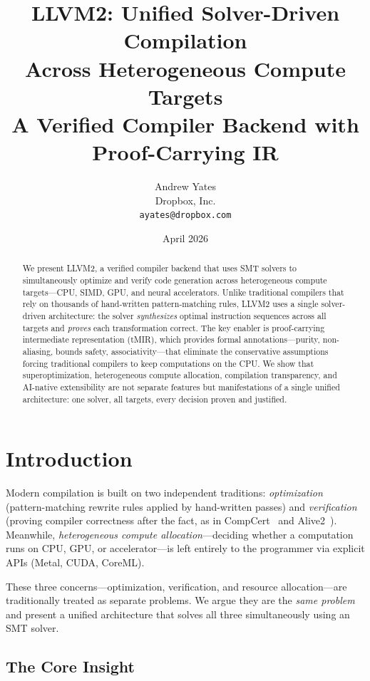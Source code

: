 \documentclass[11pt,twocolumn]{article}
\title{\textbf{LLVM2: Unified Solver-Driven Compilation\\Across Heterogeneous Compute Targets}\\[0.5em]
\large A Verified Compiler Backend with Proof-Carrying IR}
\author{Andrew Yates\\Dropbox, Inc.\\{\small\texttt{ayates@dropbox.com}}}
\date{April 2026}
\begin{document}
\maketitle

\begin{abstract}
We present LLVM2, a verified compiler backend that uses SMT solvers to simultaneously optimize and verify code generation across heterogeneous compute targets---CPU, SIMD, GPU, and neural accelerators. Unlike traditional compilers that rely on thousands of hand-written pattern-matching rules, LLVM2 uses a single solver-driven architecture: the solver \emph{synthesizes} optimal instruction sequences across all targets and \emph{proves} each transformation correct. The key enabler is proof-carrying intermediate representation (tMIR), which provides formal annotations---purity, non-aliasing, bounds safety, associativity---that eliminate the conservative assumptions forcing traditional compilers to keep computations on the CPU. We show that superoptimization, heterogeneous compute allocation, compilation transparency, and AI-native extensibility are not separate features but manifestations of a single unified architecture: one solver, all targets, every decision proven and justified.
\end{abstract}

\section{Introduction}

Modern compilation is built on two independent traditions: \emph{optimization} (pattern-matching rewrite rules applied by hand-written passes) and \emph{verification} (proving compiler correctness after the fact, as in CompCert~\cite{compcert} and Alive2~\cite{alive2}). Meanwhile, \emph{heterogeneous compute allocation}---deciding whether a computation runs on CPU, GPU, or accelerator---is left entirely to the programmer via explicit APIs (Metal, CUDA, CoreML).

These three concerns---optimization, verification, and resource allocation---are traditionally treated as separate problems. We argue they are the \emph{same problem} and present a unified architecture that solves all three simultaneously using an SMT solver.

\subsection{The Core Insight}
\end{document}
